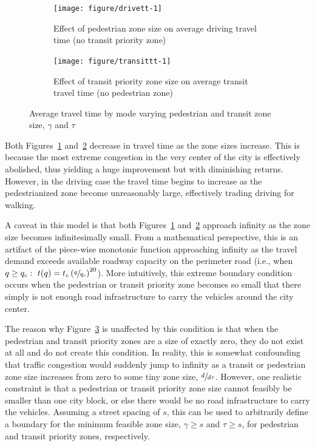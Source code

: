 \documentclass{elsarticle}\usepackage[]{graphicx}\usepackage[]{color}
\newenvironment{knitrout}{}{} %
\begin{document}
\begin{figure}[H]
     \centering
     \begin{subfigure}[b]{0.49\textwidth}
         \centering
\begin{knitrout}
\color{fgcolor}
\texttt{[image: figure/drivett-1]} 
\end{knitrout}
         \caption{Effect of pedestrian zone size on average driving travel time (no transit priority zone)}
         \label{fig:ttpedzone}
     \end{subfigure}
     \hfill
     \begin{subfigure}[b]{0.49\textwidth}
         \centering
\begin{knitrout}
\color{fgcolor}
\texttt{[image: figure/transittt-1]} 
\end{knitrout}
        \caption{Effect of transit priority zone size on average transit travel time (no pedestrian zone)}
         \label{fig:tttransitzone}
     \end{subfigure}
        \caption{Average travel time by mode varying pedestrian and transit zone size, $\gamma$ and $\tau$}
        \label{fig:modett}
\end{figure}

Both Figures~\ref{fig:ttpedzone} and~\ref{fig:tttransitzone} decrease in travel time as the zone sizes increase. This is because the most extreme congestion in the very center of the city is effectively abolished, thus yielding a huge improvement but with diminishing returns. However, in the driving case the travel time begins to increase as the pedestrianized zone become unreasonably large, effectively trading driving for walking. 

A caveat in this model is that both Figures~\ref{fig:ttpedzone} and~\ref{fig:tttransitzone} approach infinity as the zone size becomes infinitesimally small. From a mathematical perspective, this is an artifact of the piece-wise monotonic function approaching infinity as the travel demand exceeds available roadway capacity on the perimeter road (i.e., when $q \geq q_c:~t(q)=t_c \left(\sfrac{q}{q_c}\right)^{20}$). More intuitively, this extreme boundary condition occurs when the pedestrian or transit priority zone becomes so small that there simply is not enough road infrastructure to carry the vehicles around the city center. 

The reason why Figure~\ref{fig:modett} is unaffected by this condition is that when the pedestrian and transit priority zones are a size of exactly zero, they do not exist at all and do not create this condition. In reality, this is somewhat confounding that traffic congestion would suddenly jump to infinity as a transit or pedestrian zone size increases from zero to some tiny zone size, $\sfrac{d}{d\tau}$. However, one realistic constraint is that a pedestrian or transit priority zone size cannot feasibly be smaller than one city block, or else there would be no road infrastructure to carry the vehicles. Assuming a street spacing of $s$, this can be used to arbitrarily define a boundary for the minimum feasible zone size, $\gamma \geq s$ and $\tau \geq s$, for pedestrian and transit priority zones, respectively. 
\end{document}
